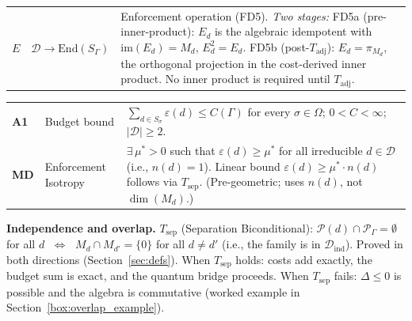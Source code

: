 \documentclass[11pt]{article}
\theoremstyle{remark}
\begin{document}
\begin{tcolorbox}[defbox, title={Formal Specification I: Enforcement Primitives at Interface $\Gamma$}]
\begin{tabular}{@{}p{1.5cm}p{3.6cm}p{7.3cm}@{}}
$E$ & $\mathcal{D} \to \mathrm{End}(S_\Gamma)$ & Enforcement operation (FD5).  \textit{Two stages:} FD5a (pre-inner-product): $E_d$ is the algebraic idempotent with $\mathrm{im}(E_d) = M_d$, $E_d^2 = E_d$.  FD5b (post-$T_{\mathrm{adj}}$): $E_d = \pi_{M_d}$, the orthogonal projection in the cost-derived inner product.  No inner product is required until $T_{\mathrm{adj}}$. \\
\end{tabular}
\end{tcolorbox}

\begin{tcolorbox}[defbox, title={Formal Specification II: Axiom, Structural Assumption, and Separation}]

\begin{tabular}{@{}p{1.5cm}p{3.6cm}p{7.3cm}@{}}
\textbf{A1} & Budget bound & $\sum_{d \in S_\sigma} \varepsilon(d) \le C(\Gamma)$ for every $\sigma \in \Omega$; $0 < C < \infty$; $|\mathcal{D}| \ge 2$. \\[4pt]
\textbf{MD} & Enforcement Isotropy & $\exists\, \mu^* > 0$ such that $\varepsilon(d) \ge \mu^*$ for all irreducible $d \in \mathcal{D}$ (i.e., $n(d) = 1$).  Linear bound $\varepsilon(d) \ge \mu^* \cdot n(d)$ follows via $T_{\mathrm{sep}}$.  (Pre-geometric; uses $n(d)$, not $\dim(M_d)$.) \\
\end{tabular}

\medskip\noindent\textbf{Independence and overlap.}
$T_{\mathrm{sep}}$ (Separation Biconditional): $\mathcal{P}(d) \cap \mathcal{P}_\Gamma = \emptyset$ for all $d$ $\;\Longleftrightarrow\;$ $M_d \cap M_{d'} = \{0\}$ for all $d \ne d'$ (i.e., the family is in $\mathcal{D}_{\mathrm{ind}}$).  Proved in both directions (Section~\ref{sec:defs}).  When $T_{\mathrm{sep}}$ holds: costs add exactly, the budget sum is exact, and the quantum bridge proceeds.  When $T_{\mathrm{sep}}$ fails: $\Delta \le 0$ is possible and the algebra is commutative (worked example in Section~\ref{box:overlap_example}).
\end{tcolorbox}
\end{document}
